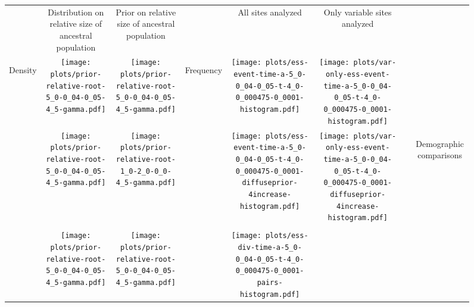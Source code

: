\documentclass[border=10pt,varwidth=30cm]{standalone}
\begin{document}
\begin{figure}
    \setlength\arrayrulewidth{2pt}
    \centering
    \begin{tabular}{@{}cccccccc@{}}
        & \multirow{1}{0.15\textwidth}{\centering\Large Distribution on relative size of ancestral population}
        & \multirow{1}{0.15\textwidth}{\centering\Large Prior on relative size of ancestral population}
        &
        & \multirow{1}{0.15\textwidth}{\centering\Large All sites analyzed}
        & \multirow{1}{0.15\textwidth}{\centering\Large Only variable sites analyzed}
        & 
        & \\[9ex]
        \multirow{5}{*}[-8em]{\begin{sideways}\large Density\end{sideways}}
        & \texttt{[image: plots/prior-relative-root-5\_0-0\_04-0\_05-4\_5-gamma.pdf]}
        & \texttt{[image: plots/prior-relative-root-5\_0-0\_04-0\_05-4\_5-gamma.pdf]}
        & \multirow{5}{*}[-14em]{\begin{sideways}\large Frequency\end{sideways}}
        & \texttt{[image: plots/ess-event-time-a-5\_0-0\_04-0\_05-t-4\_0-0\_000475-0\_0001-histogram.pdf]}
        & \texttt{[image: plots/var-only-ess-event-time-a-5\_0-0\_04-0\_05-t-4\_0-0\_000475-0\_0001-histogram.pdf]} 
        & \multicolumn{1}{c|}{} 
        & \\
        & \texttt{[image: plots/prior-relative-root-5\_0-0\_04-0\_05-4\_5-gamma.pdf]}
        & \texttt{[image: plots/prior-relative-root-1\_0-2\_0-0\_0-4\_5-gamma.pdf]}
        &
        & \texttt{[image: plots/ess-event-time-a-5\_0-0\_04-0\_05-t-4\_0-0\_000475-0\_0001-diffuseprior-4increase-histogram.pdf]}
        & \texttt{[image: plots/var-only-ess-event-time-a-5\_0-0\_04-0\_05-t-4\_0-0\_000475-0\_0001-diffuseprior-4increase-histogram.pdf]}
        & \multicolumn{1}{c|}{} 
        & \multirow{5}{*}[17em]{\begin{sideways}\Large Demographic comparisons\end{sideways}} \\
        & & & & & & & \\
        & \texttt{[image: plots/prior-relative-root-5\_0-0\_04-0\_05-4\_5-gamma.pdf]}
        & \texttt{[image: plots/prior-relative-root-5\_0-0\_04-0\_05-4\_5-gamma.pdf]}
        &
        & \texttt{[image: plots/ess-div-time-a-5\_0-0\_04-0\_05-t-4\_0-0\_000475-0\_0001-pairs-histogram.pdf]}

\end{tabular}
\end{figure}
\end{document}
